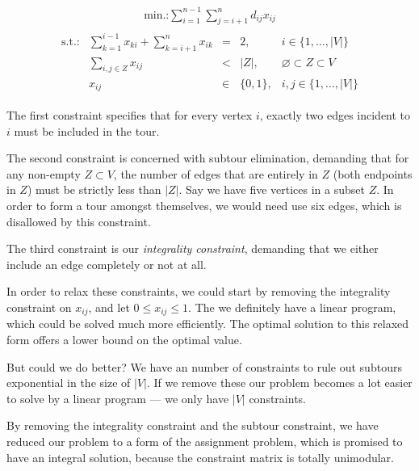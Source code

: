 \documentclass{article}
\begin{document}
\begin{align*}
  \text{min.:} \sum_{i=1}^{n-1}\sum_{j=i+1}^{n} d_{ij}x_{ij}
\end{align*}
\begin{align*}
  \begin{array}{lrcll}
    \text{s.t.:} & \displaystyle\sum_{k=1}^{i-1}x_{ki} + \displaystyle\sum_{k=i+1}^{n} x_{ik} &= &2, & i\in \{1,\dots,|V|\}\\
                 & \displaystyle\sum_{i,j\in Z} x_{ij} &< &|Z|, & \varnothing \subset Z \subset V\\
                 & x_{ij} &\in & \{0,1\}, & i,j \in \{1,\dots,|V|\}
  \end{array}
\end{align*}

The first constraint specifies that for every vertex $i$, exactly two
edges incident to $i$ must be included in the tour.

The second constraint is concerned with subtour elimination, demanding
that for any non-empty $Z\subset V$, the number of edges that are
entirely in $Z$ (both endpoints in $Z$) must be strictly less than
$|Z|$. Say we have five vertices in a subset $Z$. In order to form a
tour amongst themselves, we would need use six edges, which is
disallowed by this constraint.

The third constraint is our \emph{integrality constraint}, demanding
that we either include an edge completely or not at all.

In order to relax these constraints, we could start by removing the
integrality constraint on $x_{ij}$, and let $0 \leq x_{ij} \leq
1$. The we definitely have a linear program, which could be solved
much more efficiently. The optimal solution to this relaxed form offers
a lower bound on the optimal value.

But could we do better? We have an number of constraints to rule out
subtours exponential in the size of $|V|$. If we remove these our
problem becomes a lot easier to solve by a linear program --- we only
have $|V|$ constraints.

By removing the integrality constraint and the subtour constraint, we
have reduced our problem to a form of the assignment problem, which is
promised to have an integral solution, because the constraint matrix
is totally unimodular.



\end{document}
